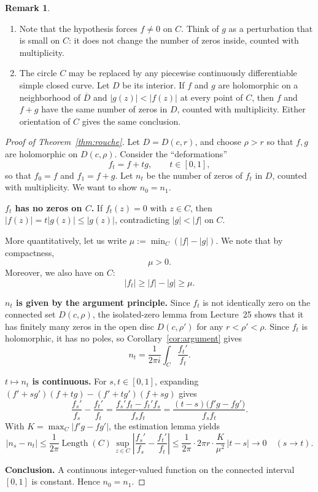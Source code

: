 \documentclass[11pt]{article}
\theoremstyle{plain}
\theoremstyle{definition}
\theoremstyle{boldremark}
\newtheorem*{remark}{Remark}
\theoremstyle{remark}
\numberwithin{equation}{section}
\begin{document}
\begin{remark}
\leavevmode
\begin{enumerate}[leftmargin=*,nosep]
\item Note that the hypothesis forces $f\ne0$ on $C$. Think of $g$ as a
perturbation that is small on $C$: it does not change the number of zeros
inside, counted with multiplicity.
\item The circle $C$ may be replaced by any piecewise continuously differentiable
simple closed curve. Let $D$ be its interior. If $f$ and $g$ are holomorphic
on a neighborhood of $\overline D$ and $|g(z)|<|f(z)|$ at every point of
$C$, then $f$ and $f+g$ have the same number of zeros in $D$, counted with
multiplicity. Either orientation of $C$ gives the same conclusion.
\end{enumerate}
\end{remark}

\begin{proof}[Proof of Theorem~\ref{thm:rouche}]
Let $D=D(c,r)$, and choose $\rho>r$ so that $f,g$ are holomorphic on
$D(c,\rho)$. Consider the ``deformations''
\[
 f_t=f+tg,\qquad t\in[0,1],
\]
so that $f_0=f$ and $f_1=f+g$. Let $n_t$ be the number of zeros of $f_t$ in
$D$, counted with multiplicity. We want to show $n_0=n_1$.

\textbf{$f_t$ has no zeros on $C$.} If $f_t(z)=0$ with $z\in C$, then
$|f(z)|=t|g(z)|\leq|g(z)|$, contradicting $|g|<|f|$ on $C$. 

More
quantitatively, let us write $\mu:=\min_C(|f|-|g|).$ We note that by compactness, $$ \mu > 0. $$ Moreover, we also have on $C$: 
$$|f_t|\geq|f|-|g|\geq\mu.$$

\textbf{$n_t$ is given by the argument principle.} Since $f_t$ is not
identically zero on the connected set $D(c,\rho)$, the isolated-zero lemma
from Lecture~25 shows that it has finitely many zeros in the open disc $D(c,\rho')$ for any
$r<\rho'<\rho$. Since $f_t$ is holomorphic, it has no poles, so
Corollary~\ref{cor:argument} gives
\[
 n_t=\frac{1}{2\pi i}\int_C\frac{f_t'}{f_t}.
\]

\textbf{$t\mapsto n_t$ is continuous.} For $s,t\in[0,1]$, expanding
$(f'+sg')(f+tg)-(f'+tg')(f+sg)$ gives
\[
 \frac{f_s'}{f_s}-\frac{f_t'}{f_t}
 =\frac{f_s'f_t-f_t'f_s}{f_sf_t}
 =\frac{(t-s)\bigl(f'g-fg'\bigr)}{f_sf_t}.
\]
With $K=\max_C|f'g-fg'|$, the estimation lemma yields
\[
 |n_s-n_t|\leq\frac{1}{2\pi}\operatorname{Length}(C)\,
 \sup_{z\in C}\left|\frac{f_s'}{f_s}-\frac{f_t'}{f_t}\right|
 \leq\frac{1}{2\pi}\cdot2\pi r\cdot\frac{K}{\mu^2}\,|t-s|
 \longrightarrow0\quad(s\to t).
\]

\textbf{Conclusion.} A continuous integer-valued function on the connected
interval $[0,1]$ is constant. Hence $n_0=n_1$.
\end{proof}
\end{document}

